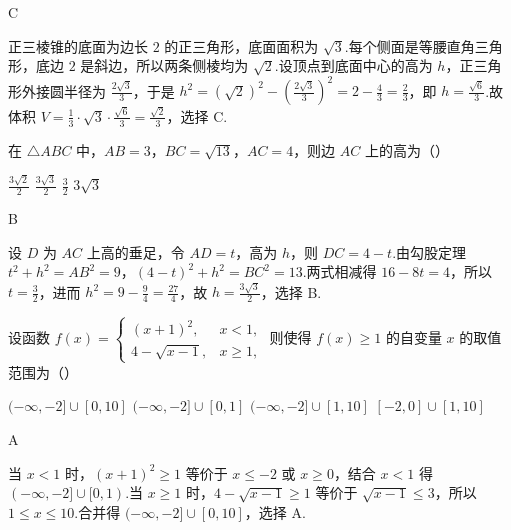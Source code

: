\begin{answer}C\end{answer}

\begin{solution}
正三棱锥的底面为边长 \(2\) 的正三角形，底面面积为 \(\sqrt{3}\).每个侧面是等腰直角三角形，底边 \(2\) 是斜边，所以两条侧棱均为 \(\sqrt{2}\).设顶点到底面中心的高为 \(h\)，正三角形外接圆半径为 \(\frac{2\sqrt{3}}{3}\)，于是 \(h^2=\left(\sqrt{2}\right)^2-\left(\frac{2\sqrt{3}}{3}\right)^2=2-\frac43=\frac23\)，即 \(h=\frac{\sqrt{6}}{3}\).故体积 \(V=\frac13\cdot\sqrt{3}\cdot\frac{\sqrt{6}}{3}=\frac{\sqrt{2}}{3}\)，选择 C.
\end{solution}

\begin{problem}
在 \(\triangle ABC\) 中，\(AB = 3\)，\(BC = \sqrt{13}\)，\(AC = 4\)，则边 \(AC\) 上的高为（\quad）

\choices
    {\(\frac{3\sqrt{2}}{2}\)}
    {\(\frac{3\sqrt{3}}{2}\)}
    {\(\frac{3}{2}\)}
    {\(3\sqrt{3}\)}
\end{problem}

\begin{answer}B\end{answer}

\begin{solution}
设 \(D\) 为 \(AC\) 上高的垂足，令 \(AD=t\)，高为 \(h\)，则 \(DC=4-t\).由勾股定理 \(t^2+h^2=AB^2=9\)，\((4-t)^2+h^2=BC^2=13\).两式相减得 \(16-8t=4\)，所以 \(t=\frac32\)，进而 \(h^2=9-\frac94=\frac{27}{4}\)，故 \(h=\frac{3\sqrt{3}}2\)，选择 B.
\end{solution}

\begin{problem}
设函数 \(f(x) = \begin{cases}
(x + 1)^2, & x < 1,\\
4 - \sqrt{x - 1}, & x \geqslant 1,
\end{cases}\) 则使得 \(f(x) \geqslant 1\) 的自变量 \(x\) 的取值范围为（\quad）

\choices
    {\((-\infty, -2] \cup [0, 10]\)}
    {\((-\infty, -2] \cup [0, 1]\)}
    {\((-\infty, -2] \cup [1, 10]\)}
    {\([-2,0] \cup [1,10]\)}
\end{problem}

\begin{answer}A\end{answer}

\begin{solution}
当 \(x<1\) 时，\((x+1)^2\geqslant1\) 等价于 \(x\leqslant-2\) 或 \(x\geqslant0\)，结合 \(x<1\) 得 \((-\infty,-2]\cup[0,1)\).当 \(x\geqslant1\) 时，\(4-\sqrt{x-1}\geqslant1\) 等价于 \(\sqrt{x-1}\leqslant3\)，所以 \(1\leqslant x\leqslant10\).合并得 \((-\infty,-2]\cup[0,10]\)，选择 A.
\end{solution}

